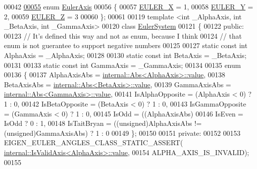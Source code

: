 \begin{DoxyCode}
00042   
\hyperlink{namespace_eigen_ae614aa7cdd687fb5c421a54f2ce5c361}{00055}   \textcolor{keyword}{enum} \hyperlink{namespace_eigen_ae614aa7cdd687fb5c421a54f2ce5c361}{EulerAxis}
00056   \{
00057     \hyperlink{namespace_eigen_ae614aa7cdd687fb5c421a54f2ce5c361ae8110af93d433bfcf247d6bac5e1d387}{EULER\_X} = 1, 
00058     \hyperlink{namespace_eigen_ae614aa7cdd687fb5c421a54f2ce5c361a7309edb53a9d9cdb77fac7c1e9200263}{EULER\_Y} = 2, 
00059     \hyperlink{namespace_eigen_ae614aa7cdd687fb5c421a54f2ce5c361a0c641fd5050b5219d6c172ac83fb379d}{EULER\_Z} = 3  
00060   \};
00061   
00119   \textcolor{keyword}{template} <\textcolor{keywordtype}{int} \_AlphaAxis, \textcolor{keywordtype}{int} \_BetaAxis, \textcolor{keywordtype}{int} \_GammaAxis>
00120   \textcolor{keyword}{class }\hyperlink{class_eigen_1_1_euler_system}{EulerSystem}
00121   \{
00122     \textcolor{keyword}{public}:
00123     \textcolor{comment}{// It's defined this way and not as enum, because I think}
00124     \textcolor{comment}{//  that enum is not guerantee to support negative numbers}
00125     
00127     \textcolor{keyword}{static} \textcolor{keyword}{const} \textcolor{keywordtype}{int} AlphaAxis = \_AlphaAxis;
00128     
00130     \textcolor{keyword}{static} \textcolor{keyword}{const} \textcolor{keywordtype}{int} BetaAxis = \_BetaAxis;
00131     
00133     \textcolor{keyword}{static} \textcolor{keyword}{const} \textcolor{keywordtype}{int} GammaAxis = \_GammaAxis;
00134 
00135     \textcolor{keyword}{enum}
00136     \{
00137       AlphaAxisAbs = \hyperlink{struct_eigen_1_1internal_1_1_abs}{internal::Abs<AlphaAxis>::value}, 
00138       BetaAxisAbs = \hyperlink{struct_eigen_1_1internal_1_1_abs}{internal::Abs<BetaAxis>::value}, 
00139       GammaAxisAbs = \hyperlink{struct_eigen_1_1internal_1_1_abs}{internal::Abs<GammaAxis>::value}, 
00141       IsAlphaOpposite = (AlphaAxis < 0) ? 1 : 0, 
00142       IsBetaOpposite = (BetaAxis < 0) ? 1 : 0, 
00143       IsGammaOpposite = (GammaAxis < 0) ? 1 : 0, 
00145       IsOdd = ((AlphaAxisAbs)%
00146       IsEven = IsOdd ? 0 : 1, 
00148       IsTaitBryan = ((unsigned)AlphaAxisAbs != (\textcolor{keywordtype}{unsigned})GammaAxisAbs) ? 1 : 0 
00149     \};
00150     
00151     \textcolor{keyword}{private}:
00152     
00153     EIGEN\_EULER\_ANGLES\_CLASS\_STATIC\_ASSERT(
      \hyperlink{struct_eigen_1_1internal_1_1_is_valid_axis}{internal::IsValidAxis<AlphaAxis>::value},
00154       ALPHA\_AXIS\_IS\_INVALID);
00155       

\end{DoxyCode}
